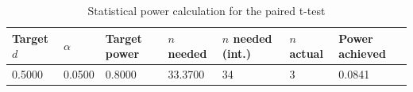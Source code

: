 \begin{table}[htbp]
\centering
\footnotesize
\caption{Statistical power calculation for the paired t-test}
\label{tab:power_calculation}
\begin{tabular}{lllllll}
\toprule
Target $d$ & $\alpha$ & Target power & $n$ needed & $n$ needed (int.) & $n$ actual & Power achieved \\
\midrule
0.5000 & 0.0500 & 0.8000 & 33.3700 & 34 & 3 & 0.0841 \\
\bottomrule
\end{tabular}
\end{table}
